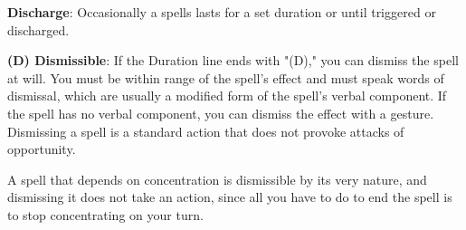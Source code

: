 \textbf{Discharge}: Occasionally a spells lasts for a set duration or until triggered or discharged.

\textbf{(D) Dismissible}: If the Duration line ends with "(D)," you can dismiss the spell at will. You must be within range of the spell's effect and must speak words of dismissal, which are usually a modified form of the spell's verbal component. If the spell has no verbal component, you can dismiss the effect with a gesture. Dismissing a spell is a standard action that does not provoke attacks of opportunity.

A spell that depends on concentration is dismissible by its very nature, and dismissing it does not take an action, since all you have to do to end the spell is to stop concentrating on your turn.